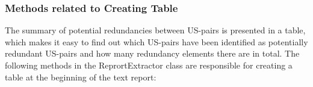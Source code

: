 \subsubsection*{Methods related to Creating Table}
The summary of potential redundancies between US-pairs is presented in a table, which makes it easy to find out which US-pairs have been identified as potentially redundant US-pairs and how many redundancy elements there are in total.
The following methods in the ReprortExtractor class are responsible for creating a table at the beginning of the text report:
